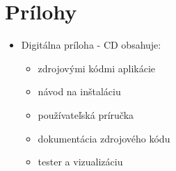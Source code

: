 \documentclass[12pt,a4paper]{report}
\theoremstyle{definition}
\theoremstyle{remark}
\begin{document}
\chapter*{Prílohy}

\begin{itemize}
\item Digitálna príloha - CD obsahuje:
	\begin{itemize}
	\item zdrojovými kódmi aplikácie
	\item návod na inštaláciu
	\item používateľská príručka
	\item dokumentácia zdrojového kódu
	\item tester a vizualizáciu
	\end{itemize}
\end{itemize}
\end{document}
